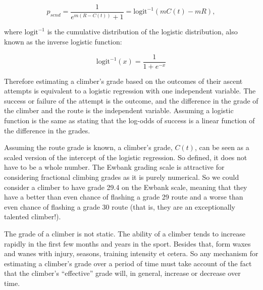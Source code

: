 \documentclass{article}
\begin{document}
\begin{equation}
p_{send} = \frac{1}{e^{m(R-C(t))} + 1} = \textrm{logit}^{-1}(mC(t)-mR),
\label{logisticp}
\end{equation}

where $\textrm{logit}^{-1}$ is the cumulative distribution of the logistic distribution, also known as the inverse logistic function:

\begin{equation}
\textrm{logit}^{-1}(x) = \frac{1}{1 + e^{-x}}
\end{equation}

Therefore estimating a climber's grade based on the outcomes of their ascent attempts is equivalent to a logistic regression with one independent variable. The success or failure of the attempt is the outcome, and the difference in the grade of the climber and the route is the independent variable. Assuming a logistic function is the same as stating that the log-odds of success is a linear function of the difference in the grades.

            


Assuming the route grade is known, a climber's grade, $C(t)$, can be seen as a scaled version of the intercept of the logistic regression. So defined, it does not have to be a whole number. The Ewbank grading scale is attractive for considering fractional climbing grades as it is purely numerical. So we could consider a climber to have grade 29.4 on the Ewbank scale, meaning that they have a better than even chance of flashing a grade 29 route and a worse than even chance of flashing a grade 30 route (that is, they are an exceptionally talented climber!).

The grade of a climber is not static. The ability of a climber tends to increase rapidly in the first few months and years in the sport. Besides that, form waxes and wanes with injury, seasons, training intensity et cetera. So any mechanism for estimating a climber's grade over a period of time must take account of the fact that the climber's ``effective'' grade will, in general, increase or decrease over time.
\end{document}
